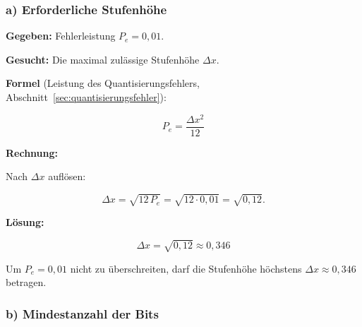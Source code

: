 \subsubsection*{a) Erforderliche Stufenhöhe}

\begin{beispiel}

\textbf{Gegeben:} Fehlerleistung $P_e = 0{,}01$.

\textbf{Gesucht:} Die maximal zulässige Stufenhöhe $\Delta x$.

\textbf{Formel} (Leistung des Quantisierungsfehlers,
Abschnitt~\ref{sec:quantisierungsfehler}):

$$
P_e = \frac{\Delta x^2}{12}
$$

\textbf{Rechnung:}

Nach $\Delta x$ auflösen:

$$
\Delta x = \sqrt{12\, P_e} = \sqrt{12 \cdot 0{,}01} = \sqrt{0{,}12}.
$$

\textbf{Lösung:}

$$
\boxed{\;\Delta x = \sqrt{0{,}12} \approx 0{,}346\;}
$$

Um $P_e = 0{,}01$ nicht zu überschreiten, darf die Stufenhöhe höchstens
$\Delta x \approx 0{,}346$ betragen.

\end{beispiel}

\subsubsection*{b) Mindestanzahl der Bits}


